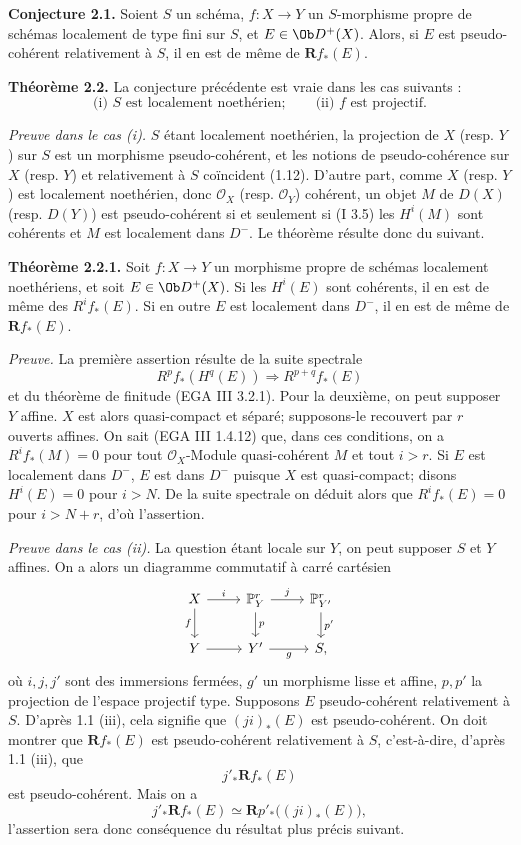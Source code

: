 \documentclass[11pt]{article}
\begin{document}
\textbf{Conjecture 2.1.} Soient \(S\) un schéma, \(f:X\to Y\) un \(S\)-morphisme propre de schémas localement de type fini sur \(S\), et \(E\in\Ob D^+(X)\). Alors, si \(E\) est pseudo-cohérent relativement à \(S\), il en est de même de \(\mathbf Rf_*(E)\).

\textbf{Théorème 2.2.} La conjecture précédente est vraie dans les cas suivants :
\[
  \text{(i) } S\text{ est localement noethérien};\qquad
  \text{(ii) } f\text{ est projectif}.
\]

\emph{Preuve dans le cas (i).} \(S\) étant localement noethérien, la projection de \(X\) (resp. \(Y\)) sur \(S\) est un morphisme pseudo-cohérent, et les notions de pseudo-cohérence sur \(X\) (resp. \(Y\)) et relativement à \(S\) coïncident (1.12). D'autre part, comme \(X\) (resp. \(Y\)) est localement noethérien, donc \(\mathcal O_X\) (resp. \(\mathcal O_Y\)) cohérent, un objet \(M\) de \(D(X)\) (resp. \(D(Y)\)) est pseudo-cohérent si et seulement si (I 3.5) les \(H^i(M)\) sont cohérents et \(M\) est localement dans \(D^{-}\). Le théorème résulte donc du suivant.

\textbf{Théorème 2.2.1.} Soit \(f:X\to Y\) un morphisme propre de schémas localement noethériens, et soit \(E\in\Ob D^+(X)\). Si les \(H^i(E)\) sont cohérents, il en est de même des \(R^if_*(E)\). Si en outre \(E\) est localement dans \(D^{-}\), il en est de même de \(\mathbf Rf_*(E)\).

\emph{Preuve.} La première assertion résulte de la suite spectrale
\[
  R^pf_*(H^q(E)) \Longrightarrow R^{p+q}f_*(E)
\]
et du théorème de finitude (EGA III 3.2.1). Pour la deuxième, on peut supposer \(Y\) affine. \(X\) est alors quasi-compact et séparé; supposons-le recouvert par \(r\) ouverts affines. On sait (EGA III 1.4.12) que, dans ces conditions, on a \(R^if_*(M)=0\) pour tout \(\mathcal O_X\)-Module quasi-cohérent \(M\) et tout \(i>r\). Si \(E\) est localement dans \(D^{-}\), \(E\) est dans \(D^{-}\) puisque \(X\) est quasi-compact; disons \(H^i(E)=0\) pour \(i>N\). De la suite spectrale on déduit alors que \(R^if_*(E)=0\) pour \(i>N+r\), d'où l'assertion.

\emph{Preuve dans le cas (ii).} La question étant locale sur \(Y\), on peut supposer \(S\) et \(Y\) affines. On a alors un diagramme commutatif à carré cartésien
\[
\begin{tikzcd}
X \arrow[r,"i"] \arrow[d,"f"'] & \mathbb P^r_Y \arrow[d,"p"] \arrow[r,"j"] & \mathbb P^r_{Y'} \arrow[d,"p'"]\\
Y \arrow[r] & Y' \arrow[r,"g"'] & S,
\end{tikzcd}
\]
où \(i,j,j'\) sont des immersions fermées, \(g'\) un morphisme lisse et affine, \(p,p'\) la projection de l'espace projectif type. Supposons \(E\) pseudo-cohérent relativement à \(S\). D'après 1.1 (iii), cela signifie que \((ji)_*(E)\) est pseudo-cohérent. On doit montrer que \(\mathbf Rf_*(E)\) est pseudo-cohérent relativement à \(S\), c'est-à-dire, d'après 1.1 (iii), que
\[
  j'_*\mathbf Rf_*(E)
\]
est pseudo-cohérent. Mais on a
\[
  j'_*\mathbf Rf_*(E)\simeq \mathbf Rp'_*\bigl((ji)_*(E)\bigr),
\]
l'assertion sera donc conséquence du résultat plus précis suivant.
\end{document}
